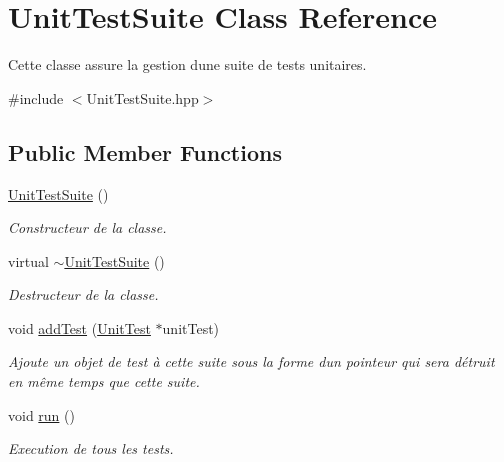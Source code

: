 \hypertarget{classUnitTestSuite}{}\section{Unit\+Test\+Suite Class Reference}
\label{classUnitTestSuite}


Cette classe assure la gestion d\textquotesingle{}une suite de tests unitaires.  




{\ttfamily \#include $<$Unit\+Test\+Suite.\+hpp$>$}

\subsection*{Public Member Functions}
\begin{DoxyCompactItemize}
\item 
\mbox{\label{classUnitTestSuite_a3f61dce247738e49da55b9c38ca4ca52}} 
\hyperlink{classUnitTestSuite_a3f61dce247738e49da55b9c38ca4ca52}{Unit\+Test\+Suite} ()
\begin{DoxyCompactList}\small\item\em Constructeur de la classe. \end{DoxyCompactList}\item 
\mbox{\label{classUnitTestSuite_aa24710540a1d16d4ae096723c097a92e}} 
virtual \hyperlink{classUnitTestSuite_aa24710540a1d16d4ae096723c097a92e}{$\sim$\+Unit\+Test\+Suite} ()
\begin{DoxyCompactList}\small\item\em Destructeur de la classe. \end{DoxyCompactList}\item 
void \hyperlink{classUnitTestSuite_aa2dda6bd93f28e28eb8fe333ba5ac16a}{add\+Test} (\hyperlink{classUnitTest}{Unit\+Test} $\ast$unit\+Test)
\begin{DoxyCompactList}\small\item\em Ajoute un objet de test à cette suite sous la forme d\textquotesingle{}un pointeur qui sera détruit en même temps que cette suite. \end{DoxyCompactList}\item 
\mbox{\label{classUnitTestSuite_af7b586b2771e5b876628be90e33aba5e}} 
void \hyperlink{classUnitTestSuite_af7b586b2771e5b876628be90e33aba5e}{run} ()
\begin{DoxyCompactList}\small\item\em Execution de tous les tests. \end{DoxyCompactList}\end{DoxyCompactItemize}


